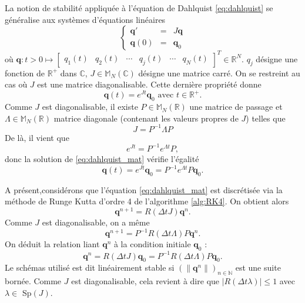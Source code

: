 La notion de stabilité appliquée à l'équation de Dahlquist \eqref{eq:dahlquist} se généralise aux systèmes d'équations linéaires
\begin{equation}
\left\lbrace
\begin{array}{rcl}
\mathbf{q}' & = & J \mathbf{q} \\
\mathbf{q}(0) & = & \mathbf{q}_0 
\end{array}
\right.
\label{eq:dahlquist_mat}
\end{equation}
où $\mathbf{q} : t>0 \mapsto \begin{bmatrix}
q_1(t) & q_2(t) & \cdots & q_j(t) & \cdots & q_N(t)
\end{bmatrix}^T \in \mathbb{R}^N$.
$q_j$ désigne une fonction de $\mathbb{R}^+$ dans $\mathbb{C}$, $J \in \mathbb{M}_N (\mathbb{C})$ désigne une matrice carré. On se restreint au cas où $J$ est une matrice diagonalisable.
Cette dernière propriété donne
\begin{equation}
\mathbf{q}(t) = e^{Jt}\mathbf{q}_0 \text{ avec } t \in \mathbb{R}^+.
\end{equation}
Comme $J$ est diagonalisable, il existe $P \in \mathbb{M}_N(\mathbb{R})$ une matrice de passage et $\Lambda \in \mathbb{M}_N(\mathbb{R})$ matrice diagonale (contenant les valeurs propres de $J$) telles que
\begin{equation}
J = P^{-1} \Lambda P
\end{equation}
De là, il vient que 
\begin{equation}
e^{Jt} = P^{-1}e^{\Lambda t}P,
\end{equation}
donc la solution de \eqref{eq:dahlquist_mat} vérifie l'égalité 
\begin{equation}
\mathbf{q}(t) = e^{Jt}\mathbf{q}_0 = P^{-1}e^{\Lambda t}P\mathbf{q}_0.
\end{equation}

A présent,considérons que l'équation \eqref{eq:dahlquist_mat} est discrétisée via la méthode de Runge Kutta d'ordre 4 de l'algorithme \ref{alg:RK4}. On obtient alors 
\begin{equation}
\mathbf{q}^{n+1} = R(\Delta t J) \mathbf{q}^n.
\end{equation}
Comme $J$ est diagonalisable, on a même
\begin{equation}
\mathbf{q}^{n+1} = P^{-1}R(\Delta t \Lambda)P \mathbf{q}^n.
\end{equation}
On déduit la relation liant $\mathbf{q}^n$ à la condition initiale $\mathbf{q}_0$ : 
\begin{equation}
\mathbf{q}^n = R(\Delta t J) \mathbf{q}_0 = P^{-1}R(\Delta t \Lambda)P \mathbf{q}_0.
\end{equation}
Le schémas utilisé est dit linéairement stable si $\left( \| \mathbf{q}^n \| \right)_{n \in \mathbb{N}}$ est une suite bornée. Comme $J$ est diagonalisable, cela revient à dire que $| R(\Delta t \lambda) | \leq 1$ avec $\lambda \in $ Sp$(J)$.

